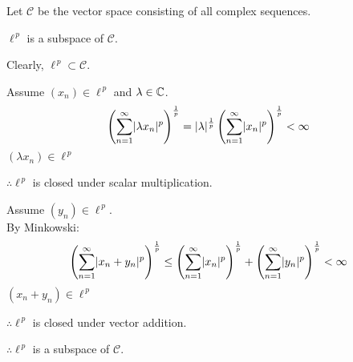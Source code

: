 \documentclass[letterpaper,12pt,fleqn]{article}
\renewcommand{\l}{\lambda}
\newcommand{\SC}{\mathcal{C}}
\newcommand{\lp}{\ell^{\,p}}
\newcommand{\normp}[2]{\sum_{n=1}^{\infty}\abs{#1}^{#2}}
\newcommand{\norm}[2]{\left(\normp{#1}{#2}\right)^{\frac{1}{#2}}}
\begin{document}
\begin{theorem}
  Let $\SC$ be the vector space consisting of all complex sequences.

  \qquad$\lp$ is a subspace of $\SC$.
\end{theorem}

\begin{theproof}
  Clearly, $\lp\subset\SC$.

  Assume $(x_n)\in\lp$ and $\l\in\C$.
  \[\norm{\l x_n}{p}=\abs{\l}^{\frac{1}{p}}\norm{x_n}{p}<\infty\]
  $(\l x_n)\in\lp$
  
  $\therefore\lp$ is closed under scalar multiplication.

  Assume $(y_n)\in\lp$. \\
  By Minkowski:
  \[\norm{x_n+y_n}{p}\le\norm{x_n}{p}+\norm{y_n}{p}<\infty\]
  $(x_n + y_n)\in\lp$

  $\therefore\lp$ is closed under vector addition.

  $\therefore\lp$ is a subspace of $\SC$.
\end{theproof}
\end{document}
